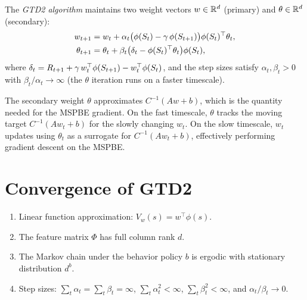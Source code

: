 \documentclass[11pt,a4paper]{article}
\begin{document}
\begin{definition}
\label{def:gtd2}
The \emph{GTD2 algorithm} \citep{sutton2009} maintains two weight
vectors $w \in \mathbb{R}^d$ (primary) and $\theta \in \mathbb{R}^d$ (secondary):
\begin{align}
  w_{t+1} &= w_t + \alpha_t
  \bigl(\phi(S_t) - \gamma\,\phi(S_{t+1})\bigr)
  \phi(S_t)^\top \theta_t,
  \label{eq:gtd2_w}\\
  \theta_{t+1} &= \theta_t + \beta_t
  \bigl(\delta_t - \phi(S_t)^\top \theta_t\bigr)\phi(S_t),
  \label{eq:gtd2_theta}
\end{align}
where $\delta_t = R_{t+1} + \gamma\,w_t^\top\phi(S_{t+1})
- w_t^\top\phi(S_t)$, and the step sizes satisfy
$\alpha_t, \beta_t > 0$ with $\beta_t/\alpha_t \to \infty$ (the
$\theta$ iteration runs on a faster timescale).
\end{definition}

\begin{remark}
\label{rem:two_timescale}
The secondary weight $\theta$ approximates $C^{-1}(Aw + b)$, which
is the quantity needed for the MSPBE gradient. On the fast timescale,
$\theta$ tracks the moving target $C^{-1}(Aw_t + b)$ for the
slowly changing $w_t$. On the slow timescale, $w_t$ updates using
$\theta_t$ as a surrogate for $C^{-1}(Aw_t + b)$, effectively
performing gradient descent on the MSPBE.
\end{remark}

\section{Convergence of GTD2}
\label{sec:gtd2_convergence}

\begin{assumption}
\label{ass:gtd2}
\begin{enumerate}[nosep]
  \item Linear function approximation: $V_w(s) = w^\top\phi(s)$.
  \item The feature matrix $\Phi$ has full column rank $d$.
  \item The Markov chain under the behavior policy $b$ is ergodic
    with stationary distribution $d^b$.
  \item Step sizes: $\sum_t \alpha_t = \sum_t \beta_t = \infty$,
    $\sum_t \alpha_t^2 < \infty$, $\sum_t \beta_t^2 < \infty$,
    and $\alpha_t/\beta_t \to 0$.
\end{enumerate}
\end{assumption}
\end{document}
